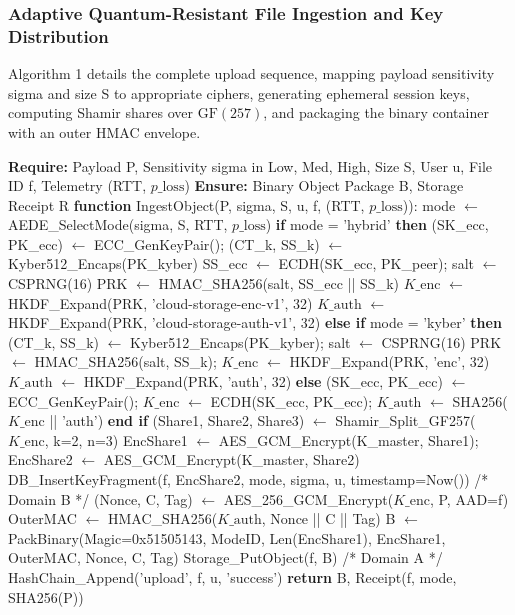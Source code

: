\documentclass[5p,times]{elsarticle}
\begin{document}
\subsubsection{Adaptive Quantum-Resistant File Ingestion and Key Distribution}

Algorithm 1 details the complete upload sequence, mapping payload sensitivity sigma and size S to appropriate ciphers, generating ephemeral session keys, computing Shamir shares over $\text{GF}(257)$, and packaging the binary container with an outer HMAC envelope.

\begin{algorithm}[!ht]
\caption{Adaptive Quantum-Resistant File Ingestion and Key Distribution Protocol}
\begin{algorithmic}[1]
  \STATE \textbf{Require:} Payload P, Sensitivity sigma in {Low, Med, High}, Size S, User u, File ID f, Telemetry (RTT, $p\_{\text{loss}}$)
  \STATE \textbf{Ensure:} Binary Object Package B, Storage Receipt R
  \STATE \textbf{function} IngestObject(P, sigma, S, u, f, (RTT, $p\_{\text{loss}}$)):
  \STATE mode $\leftarrow$ AEDE\_SelectMode(sigma, S, RTT, $p\_{\text{loss}}$)
  \STATE \textbf{if} mode = 'hybrid' \textbf{then}
  \STATE (SK\_ecc, PK\_ecc) $\leftarrow$ ECC\_GenKeyPair(); (CT\_k, SS\_k) $\leftarrow$ Kyber512\_Encaps(PK\_kyber)
  \STATE SS\_ecc $\leftarrow$ ECDH(SK\_ecc, PK\_peer); salt $\leftarrow$ CSPRNG(16)
  \STATE PRK $\leftarrow$ HMAC\_SHA256(salt, SS\_ecc || SS\_k)
  \STATE $K\_{\text{enc}}$ $\leftarrow$ HKDF\_Expand(PRK, 'cloud-storage-enc-v1', 32)
  \STATE $K\_{\text{auth}}$ $\leftarrow$ HKDF\_Expand(PRK, 'cloud-storage-auth-v1', 32)
  \STATE \textbf{else if} mode = 'kyber' \textbf{then}
  \STATE (CT\_k, SS\_k) $\leftarrow$ Kyber512\_Encaps(PK\_kyber); salt $\leftarrow$ CSPRNG(16)
  \STATE PRK $\leftarrow$ HMAC\_SHA256(salt, SS\_k); $K\_{\text{enc}}$ $\leftarrow$ HKDF\_Expand(PRK, 'enc', 32)
  \STATE $K\_{\text{auth}}$ $\leftarrow$ HKDF\_Expand(PRK, 'auth', 32)
  \STATE \textbf{else} (SK\_ecc, PK\_ecc) $\leftarrow$ ECC\_GenKeyPair(); $K\_{\text{enc}}$ $\leftarrow$ ECDH(SK\_ecc, PK\_ecc); $K\_{\text{auth}}$ $\leftarrow$ SHA256($K\_{\text{enc}}$ || 'auth') \textbf{end if}
  \STATE (Share1, Share2, Share3) $\leftarrow$ Shamir\_Split\_GF257($K\_{\text{enc}}$, k=2, n=3)
  \STATE EncShare1 $\leftarrow$ AES\_GCM\_Encrypt(K\_master, Share1); EncShare2 $\leftarrow$ AES\_GCM\_Encrypt(K\_master, Share2)
  \STATE DB\_InsertKeyFragment(f, EncShare2, mode, sigma, u, timestamp=Now()) /* Domain B */
  \STATE (Nonce, C, Tag) $\leftarrow$ AES\_256\_GCM\_Encrypt($K\_{\text{enc}}$, P, AAD=f)
  \STATE OuterMAC $\leftarrow$ HMAC\_SHA256($K\_{\text{auth}}$, Nonce || C || Tag)
  \STATE B $\leftarrow$ PackBinary(Magic=0x51505143, ModeID, Len(EncShare1), EncShare1, OuterMAC, Nonce, C, Tag)
  \STATE Storage\_PutObject(f, B) /* Domain A */
  \STATE HashChain\_Append('upload', f, u, 'success')
  \STATE \textbf{return} B, Receipt(f, mode, SHA256(P))
\end{algorithmic}
\end{algorithm}
\end{document}
